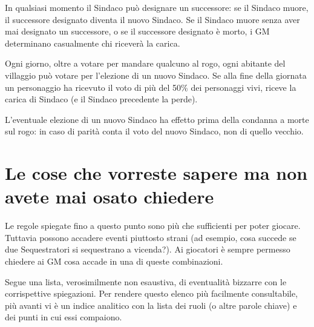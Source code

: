 \documentclass[a4paper,10pt]{article}
\begin{document}
In qualsiasi momento il Sindaco può designare un successore: se il Sindaco muore, il successore designato diventa il nuovo Sindaco. Se il Sindaco muore senza aver mai designato un successore, o se il successore designato è morto, i GM determinano casualmente chi riceverà la carica.

Ogni giorno, oltre a votare per mandare qualcuno al rogo, ogni abitante del villaggio può votare per l'elezione di un nuovo Sindaco. Se alla fine della giornata un personaggio ha ricevuto il voto di più del 50\% dei personaggi vivi, riceve la carica di Sindaco (e il Sindaco precedente la perde).

L'eventuale elezione di un nuovo Sindaco ha effetto prima della condanna a morte sul rogo: in caso di parità conta il voto del nuovo Sindaco, non di quello vecchio.


\pagebreak
\section{Le cose che vorreste sapere ma non avete mai osato chiedere}
\label{faq}

Le regole spiegate fino a questo punto sono più che sufficienti per poter giocare. Tuttavia possono accadere eventi piuttosto strani (ad esempio, cosa succede se due Sequestratori si sequestrano a vicenda?). Ai giocatori è sempre permesso chiedere ai GM cosa accade in una di queste combinazioni.

Segue una lista, verosimilmente non esaustiva, di eventualità bizzarre con le corrispettive spiegazioni.
Per rendere questo elenco più facilmente consultabile, più avanti vi è un indice analitico con la lista dei ruoli (o altre parole chiave) e dei punti in cui essi compaiono.
\end{document}

